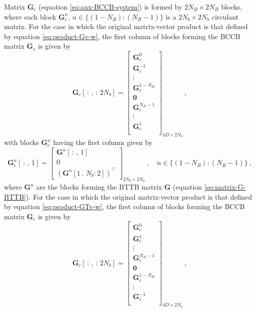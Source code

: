 \documentclass[utf8]{FrontiersinHarvard} %
\begin{document}
	Matrix $\mathbf{G}_{c}$ (equation \ref{eq:aux-BCCB-system}) is formed by $2N_{B} \times 2N_{B}$ blocks, 
	where each block $\mathbf{G}_{c}^{n}$, $n \in \{(1-N_{B}):(N_{B}-1)\}$ is a $2N_{b} \times 2N_{b}$ circulant matrix.
	For the case in which the original matrix-vector product is that defined by equation \ref{eq:product-Gv-w},
	the first column of blocks forming the BCCB matrix $\mathbf{G}_{c}$ is given by
	\begin{equation}
		\mathbf{G}_{c}[ \, : \, , \, : \, 2N_{b}] = \begin{bmatrix}
			\mathbf{G}_{c}^{0} \\
			\mathbf{G}_{c}^{-1} \\
			\vdots \\
			\mathbf{G}_{c}^{1-N_{B}} \\
			\mathbf{0} \\
			\mathbf{G}_{c}^{N_{B}-1} \\
			\vdots \\
			\mathbf{G}_{c}^{1} \\
		\end{bmatrix}_{4D \times 2N_{b}} \: ,
		\label{eq:matrix-G-BCCB-1st-block-column-G}
	\end{equation}
	with blocks $\mathbf{G}_{c}^{n}$ having the first column given by
	\begin{equation}
		\mathbf{G}_{c}^{n}[ \, : \, , \, 1] = \begin{bmatrix}
			\mathbf{G}^{n}[ \, : \, , \, 1] \\ 
			0 \\ 
			\left( \mathbf{G}^{n}[ 1 \, , \, N_{b}:2] \right)^{\top}
		\end{bmatrix}_{2N_{b} \times 2N_{b}} \: , \quad n \in \{(1-N_{B}):(N_{B}-1)\} \: ,
		\label{eq:block-Gc-ell-1st-column-G}
	\end{equation}
	where $\mathbf{G}^{n}$ are the blocks forming the BTTB matrix $\mathbf{G}$ (equation \ref{eq:matrix-G-BTTB}).
	For the case in which the original matrix-vector product is that defined by equation \ref{eq:product-GTv-w},
	the first column of blocks forming the BCCB matrix $\mathbf{G}_{c}$ is given by
	\begin{equation}
		\mathbf{G}_{c}[ \, : \, , \, : \, 2N_{b}] = \begin{bmatrix}
			\mathbf{G}_{c}^{0} \\
			\mathbf{G}_{c}^{1} \\
			\vdots \\
			\mathbf{G}_{c}^{N_{B}-1} \\
			\mathbf{0} \\
			\mathbf{G}_{c}^{1-N_{B}} \\
			\vdots \\
			\mathbf{G}_{c}^{-1} \\
		\end{bmatrix}_{4D \times 2N_{b}} \: ,
		\label{eq:matrix-G-BCCB-1st-block-column-GT}
	\end{equation}
\end{document}
